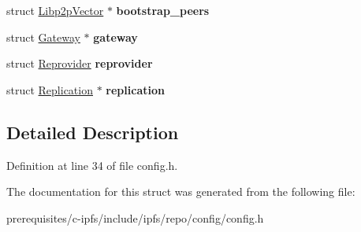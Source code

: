 \begin{DoxyCompactItemize}
struct \mbox{\hyperlink{struct_libp2p_vector}{Libp2p\+Vector}} $\ast$ {\bfseries bootstrap\+\_\+peers}
\item 
\mbox{\label{struct_repo_config_a4d5141f27ccf17ef96763f790b7ce504}} 
struct \mbox{\hyperlink{struct_gateway}{Gateway}} $\ast$ {\bfseries gateway}
\item 
\mbox{\label{struct_repo_config_a005d8cfb44efdf505b10decf7a8876da}} 
struct \mbox{\hyperlink{struct_reprovider}{Reprovider}} {\bfseries reprovider}
\item 
\mbox{\label{struct_repo_config_a5830a3c6764f0408def216764658005c}} 
struct \mbox{\hyperlink{struct_replication}{Replication}} $\ast$ {\bfseries replication}
\end{DoxyCompactItemize}


\subsection{Detailed Description}


Definition at line 34 of file config.\+h.



The documentation for this struct was generated from the following file\+:\begin{DoxyCompactItemize}
\item 
prerequisites/c-\/ipfs/include/ipfs/repo/config/config.\+h\end{DoxyCompactItemize}
